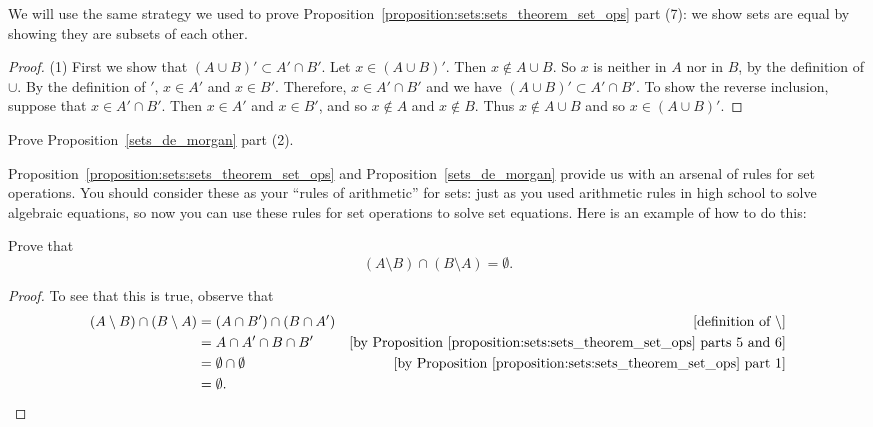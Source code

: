  We will use the same strategy we used to prove Proposition~\ref{proposition:sets:sets_theorem_set_ops} part (7): we show sets are equal by showing they are subsets of each other.
\medskip{}

\begin{proof} 

\noindent
(1)
First we show that $(A \cup B)' \subset A' \cap B'$.  Let $x \in (A \cup B)'$.  Then $x \notin A \cup B$. So $x$ is neither in $A$ nor in $B$, by the definition of $\cup$.  By the definition of $'$, $x \in A'$ and $x \in B'$.  Therefore, $x \in A' \cap B'$ and we have $(A \cup B)' \subset A' \cap B'$.
 To show the reverse inclusion, suppose that $x \in A' \cap B'$.  Then $x \in A'$ and $x \in B'$, and so $x \notin A$ and $x \notin B$.  Thus $x \notin A \cup B$ and so $x \in (A \cup B)'$.  
\end{proof}

\begin{exercise}
Prove Proposition~\ref{sets_de_morgan} part (2).
\end{exercise}
 
\medskip{}
\noindent
Proposition~\ref{proposition:sets:sets_theorem_set_ops} and Proposition~\ref{sets_de_morgan} provide us with an arsenal of rules for set operations. You should consider these as your ``rules of arithmetic'' for sets: just as you used arithmetic rules in high school to solve algebraic equations, so now you can use these rules for set operations to solve set equations.  Here is an example of how to do this:

\begin{example}\label{example:sets:other_relations}
Prove that
\[
( A \setminus B) \cap (B \setminus A) = \emptyset.
\]

\begin{proof}
To see that this is true, observe that
\begin{align*}
( A \setminus B) \cap (B \setminus A)
& =
( A \cap B') \cap (B \cap A')   & \mbox{[definition of } \setminus] \\
& =
A \cap A' \cap B \cap B'    &\mbox{[by Proposition~\ref{proposition:sets:sets_theorem_set_ops} parts 5 and 6]} \\
&= \emptyset \cap \emptyset    &\mbox{[by Proposition~\ref{proposition:sets:sets_theorem_set_ops} part 1]} \\
& = \emptyset. \\
\end{align*}
\end{proof}
\end{example}


